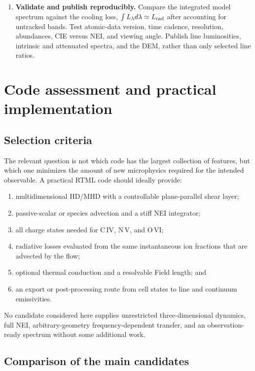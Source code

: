 \documentclass[english,a4paper]{my_memo2}
\begin{document}
\begin{enumerate}[leftmargin=*,label=\textbf{Step \arabic*.}]
\item \textbf{Validate and publish reproducibly.}  Compare the integrated
model spectrum against the cooling loss, $\int L_\lambda d\lambda\simeq
L_{\rm rad}$ after accounting for untracked bands.  Test atomic-data version,
time cadence, resolution, abundances, CIE versus NEI, and viewing angle.
Publish line luminosities, intrinsic and attenuated spectra, and the DEM,
rather than only selected line ratios.
\end{enumerate}

\section{Code assessment and practical implementation}
\label{sec:codes}

\subsection{Selection criteria}

The relevant question is not which code has the largest collection of
features, but which one minimizes the amount of new microphysics required for
the intended observable.  A practical RTML code should ideally provide:
\begin{enumerate}[leftmargin=*]
\item multidimensional HD/MHD with a controllable plane-parallel shear layer;
\item passive-scalar or species advection and a stiff NEI integrator;
\item all charge states needed for C\,IV, N\,V, and O\,VI;
\item radiative losses evaluated from the same instantaneous ion fractions
that are advected by the flow;
\item optional thermal conduction and a resolvable Field length; and
\item an export or post-processing route from cell states to line and
continuum emissivities.
\end{enumerate}
No candidate considered here supplies unrestricted three-dimensional dynamics,
full NEI, arbitrary-geometry frequency-dependent transfer, and an
observation-ready spectrum without some additional work.

\subsection{Comparison of the main candidates}
\end{document}
